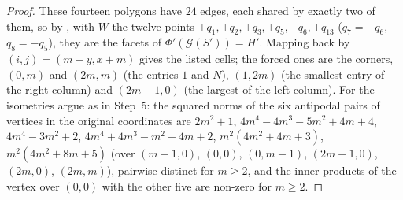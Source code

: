 \begin{proof}
These fourteen polygons have $24$ edges, each shared by exactly two of them, so by , with $W$ the twelve points $\pm q_1,\pm q_2,\pm q_3,\pm q_5,\pm q_6,\pm q_{13}$ ($q_7=-q_6$, $q_8=-q_5$), they are the facets of $\Phi'(\mathcal G(S'))=H'$.
Mapping back by $(i,j)=(m-y,x+m)$ gives the listed cells; the forced ones are the corners, $(0,m)$ and $(2m,m)$ (the entries $1$ and $N$), $(1,2m)$ (the smallest entry of the right column) and $(2m-1,0)$ (the largest of the left column).
For the isometries argue as in Step~5: the squared norms of the six antipodal pairs of vertices in the original coordinates are $2m^2+1$, $4m^4-4m^3-5m^2+4m+4$, $4m^4-3m^2+2$, $4m^4+4m^3-m^2-4m+2$, $m^2(4m^2+4m+3)$, $m^2(4m^2+8m+5)$ (over $(m-1,0)$, $(0,0)$, $(0,m-1)$, $(2m-1,0)$, $(2m,0)$, $(2m,m)$), pairwise distinct for $m\ge2$, and the inner products of the vertex over $(0,0)$ with the other five are non-zero for $m\ge2$.
\end{proof}

